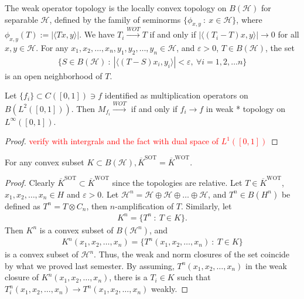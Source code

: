 \begin{definition}
  The weak operator topology is the locally convex topology on
  $B(\mathcal{H})$ for separable $\mathcal{H}$, defined by the family
  of seminorms $\{ \phi_{x, y}  \ : \  x \in \mathcal{H} \}$, where
  $\phi_{ x, y}(T) := |\langle  Tx , y \rangle |$.
  We have $T_i \stackrel{WOT}{\to} T$ if and only if $|\langle (T_i -
  T) x , y \rangle |
  \to 0$ for all $x,y \in \mathcal{H}$.
  For any $x_1 , x_2 , \ldots , x_n, y_1 , y_2 , \ldots , y_n \in
  \mathcal{H}$, and
  $\varepsilon > 0$, $T \in B(\mathcal{H})$, the set
  \begin{align*}
    \{  S \in B(\mathcal{H})  \ : \  |\langle (T - S) x_i , y_i
    \rangle | < \varepsilon, \ \forall i = 1,2, \ldots n \}
  \end{align*}
  is an open neighborhood of $T$.
\end{definition}

\begin{example}
  Let $\{ f_i \} \subset  C([0, 1]) \ni f$ identified as
  multiplication operators on $  B(L^{2}([0, 1]))$. Then $M_{f_i}
  \stackrel{WOT}{\to}$ if and only if $f_i \to f$ in weak * topology
  on $L^{\infty}([0, 1])$.
\end{example}
\begin{proof}
  \textcolor{red}{verify with intergrals and the fact with dual space
  of $L^{1}([0, 1])$}
\end{proof}

\begin{lemma}
  For any convex subset $K \subset B(\mathcal{H}),
  \overline{K}^{\textrm{SOT}} = \overline{K}^{\textrm{WOT}}$.
\end{lemma}
\begin{proof}
  Clearly $\overline{K}^{\textrm{SOT}} \subset
  \overline{K}^{\textrm{WOT}}$ since the topologies are relative.
  Let $ T \in \overline{K}^{\textrm{WOT}}$, $ x_1 , x_2 , \ldots ,
  x_n \in H$ and $ \varepsilon > 0$. Let $\mathcal{H}^n =
  \mathcal{H} \oplus \mathcal{H} \oplus \ldots \oplus \mathcal{H}$,
  and $T^n \in B(H^n)$ be defined as $T^n = T \otimes C_n$, then
  $n$-amplification of $T$. Similarly, let
  \begin{align*}
    K^n = \{ T^n  \ : \  T \in K \}.
  \end{align*}
  Then $K^n$ is a convex subset of $B(\mathcal{H}^n)$, and
  \begin{align*}
    K^n(x_1 , x_2 , \ldots , x_n) = \{ T^n(x_1 , x_2 , \ldots , x_n)
    \ : \ T \in K  \}
  \end{align*}
  is a convex subset of $\mathcal{H}^n$. Thus, the weak and norm
  closures of the set coincide by what we proved last semester. By
  assuming, $T^n(x_1 , x_2 , \ldots , x_n)$ in the weak closure of
  $K^n(x_1 , x_2 , \ldots , x_n)$, there is a $T_i \in K$ such that
  $T_i^n(x_1 , x_2 , \ldots , x_n) \to T^n(x_1 , x_2 , \ldots , x_n)$ weakly.
\end{proof}
